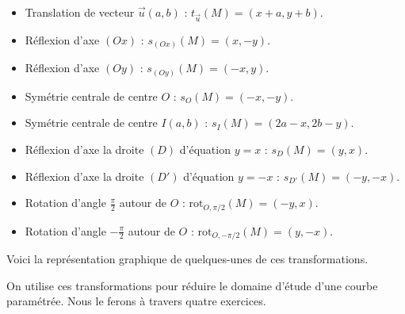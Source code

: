\documentclass[class=report,crop=false]{standalone}
\begin{document}
\begin{itemize}
  \item Translation de vecteur $\vec{u}(a,b)$ : $t_{\vec{u}}(M)=(x+a,y+b)$.
  \item Réflexion d'axe $(Ox)$ : $s_{(Ox)}(M)=(x,-y)$.
  \item Réflexion d'axe $(Oy)$ : $s_{(Oy)}(M)=(-x,y)$.
  \item Symétrie centrale de centre $O$ : $s_O(M)=(-x,-y)$.
  \item Symétrie centrale de centre $I(a,b)$ : $s_I(M)=(2a-x,2b-y)$.
  \item Réflexion d'axe la droite $(D)$ d'équation $y=x$ : $s_D(M)=(y,x)$.
  \item Réflexion d'axe la droite $(D')$ d'équation $y=-x$ : $s_{D'}(M)=(-y,-x)$.
  \item Rotation d'angle $\frac{\pi}{2}$ autour de $O$ : $\text{rot}_{O,\pi/2}(M)=(-y,x)$.
  \item Rotation d'angle $-\frac{\pi}{2}$ autour de $O$ : $\text{rot}_{O,-\pi/2}(M)=(y,-x)$.
\end{itemize}

Voici la représentation graphique de quelques-unes de ces transformations.


On utilise ces transformations pour réduire le domaine
d'étude d'une courbe paramétrée. Nous le ferons à travers quatre exercices.
\end{document}
